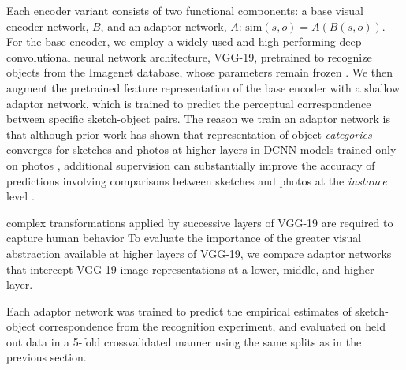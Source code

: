 \documentclass{svjour3}
\begin{document}
Each encoder variant consists of two functional components: a base visual encoder network, $B$, and an adaptor network, $A$: $\textrm{sim}(s,o) = A(B(s,o))$.
For the base encoder, we employ a widely used and high-performing deep convolutional neural network architecture, VGG-19, pretrained to recognize objects from the Imagenet database, whose parameters remain frozen \citep*{simonyan2014very,deng2009imagenet}. 
We then augment the pretrained feature representation of the base encoder with a shallow adaptor network, which is trained to predict the perceptual correspondence between specific sketch-object pairs.
The reason we train an adaptor network is that although prior work has shown that representation of object \textit{categories} converges for sketches and photos at higher layers in DCNN models trained only on photos \citep*{FanCommon2018}, additional supervision can substantially improve the accuracy of predictions involving comparisons between sketches and photos at the \textit{instance} level \citep*{sangkloy2016sketchy}. 
 
complex transformations applied by successive layers of VGG-19 are required to capture human behavior 
To evaluate the importance of the greater visual abstraction available at higher layers of VGG-19, we compare adaptor networks that intercept VGG-19 image representations at a lower, middle, and higher layer.

Each adaptor network was trained to predict the empirical estimates of sketch-object correspondence from the recognition experiment, and evaluated on held out data in a 5-fold crossvalidated manner using the same splits as in the previous section. 


\end{document}
